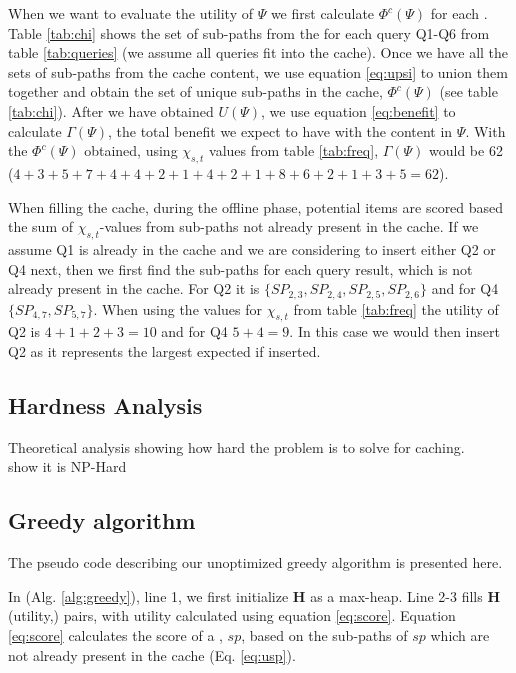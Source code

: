 When we want to evaluate the utility of $\Psi$ we first calculate $\Phi^c(\Psi)$ for each \spath. Table \ref{tab:chi} shows the set of sub-paths from the \spaths for each query Q1-Q6 from table \ref{tab:queries} (we assume all queries fit into the cache). Once we have all the sets of sub-paths from the cache content, we use equation \ref{eq:upsi} to union them together and obtain the set of unique sub-paths in the cache, $\Phi^c(\Psi)$ (see table \ref{tab:chi}). After we have obtained $U(\Psi)$, we use equation \ref{eq:benefit} to calculate $\Gamma(\Psi)$, the total benefit we expect to have with the content in $\Psi$. With the $\Phi^c(\Psi)$ obtained, using $\chi_{s,t}$ values from table \ref{tab:freq}, $\Gamma(\Psi)$ would be 62 ($4+3+5+7+4+4+2+1+4+2+1+8+6+2+1+3+5 = 62$).

When filling the cache, during the offline phase, potential \spath items are scored based the sum of $\chi_{s,t}$-values from sub-paths not already present in the cache. If we assume Q1 is already in the cache and we are considering to insert either Q2 or Q4 next, then we first find the sub-paths for each query result, which is not already present in the cache. For Q2 it is $\{SP_{2,3},SP_{2,4},SP_{2,5},SP_{2,6}\}$ and for Q4 $\{SP_{4,7},SP_{5,7}\}$. When using the values for $\chi_{s,t}$ from table \ref{tab:freq} the utility of Q2 is $4+1+2+3=10$ and for Q4 $5+4=9$. In this case we would then insert Q2 as it represents the largest expected if inserted.

\subsection{Hardness Analysis}
Theoretical analysis showing how hard the problem is to solve for \spath caching.\\
show it is NP-Hard
 

\subsection{Greedy algorithm}
The pseudo code describing our unoptimized greedy algorithm is presented here.


In \salgo (Alg. \ref{alg:greedy}), line 1, we first initialize \textbf{H} as a max-heap. Line 2-3 fills \textbf{H} (utility,\spath) pairs, with utility calculated using equation \ref{eq:score}. 
Equation \ref{eq:score} calculates the score of a \spathns, $sp$, based on the sub-paths of $sp$ which are not already present in the cache (Eq. \ref{eq:usp}).

